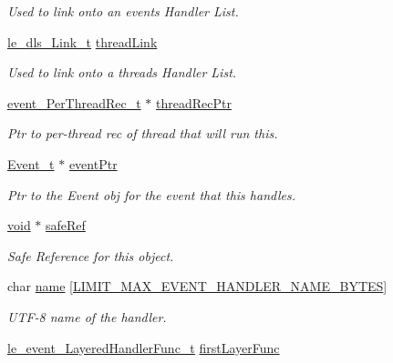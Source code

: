\begin{DoxyCompactItemize}
\begin{DoxyCompactList}\small\item\em Used to link onto an event\textquotesingle{}s Handler List. \end{DoxyCompactList}\item 
\hyperlink{structle__dls___link__t}{le\+\_\+dls\+\_\+\+Link\+\_\+t} \hyperlink{struct_handler__t_a06ce7b40aa5d8eb342c07c8f7ccb515e}{thread\+Link}
\begin{DoxyCompactList}\small\item\em Used to link onto a thread\textquotesingle{}s Handler List. \end{DoxyCompactList}\item 
\hyperlink{structevent___per_thread_rec__t}{event\+\_\+\+Per\+Thread\+Rec\+\_\+t} $\ast$ \hyperlink{struct_handler__t_a471d606790d4d1fa86610deddd0523ff}{thread\+Rec\+Ptr}
\begin{DoxyCompactList}\small\item\em Ptr to per-\/thread rec of thread that will run this. \end{DoxyCompactList}\item 
\hyperlink{struct_event__t}{Event\+\_\+t} $\ast$ \hyperlink{struct_handler__t_ab07c56e4bc6c2e2c48a7b18aa373ffc5}{event\+Ptr}
\begin{DoxyCompactList}\small\item\em Ptr to the Event obj for the event that this handles. \end{DoxyCompactList}\item 
\hyperlink{_t_e_m_p_l_a_t_e__cdef_8h_ac9c84fa68bbad002983e35ce3663c686}{void} $\ast$ \hyperlink{struct_handler__t_a93b53674f973a349f29839c50934ddd5}{safe\+Ref}
\begin{DoxyCompactList}\small\item\em Safe Reference for this object. \end{DoxyCompactList}\item 
char \hyperlink{struct_handler__t_adde45937f8deff4c4a02601845fdfb39}{name} \mbox{[}\hyperlink{limit_8h_a016ba58c43f274599f61723932c51c38}{L\+I\+M\+I\+T\+\_\+\+M\+A\+X\+\_\+\+E\+V\+E\+N\+T\+\_\+\+H\+A\+N\+D\+L\+E\+R\+\_\+\+N\+A\+M\+E\+\_\+\+B\+Y\+T\+ES}\mbox{]}
\begin{DoxyCompactList}\small\item\em U\+T\+F-\/8 name of the handler. \end{DoxyCompactList}\item 
\hyperlink{le__event_loop_8h_a325afcc96343fde371e4c63639ace2ef}{le\+\_\+event\+\_\+\+Layered\+Handler\+Func\+\_\+t} \hyperlink{struct_handler__t_a4de499c986f4959415372380c46aa0ae}{first\+Layer\+Func}

\end{DoxyCompactItemize}

